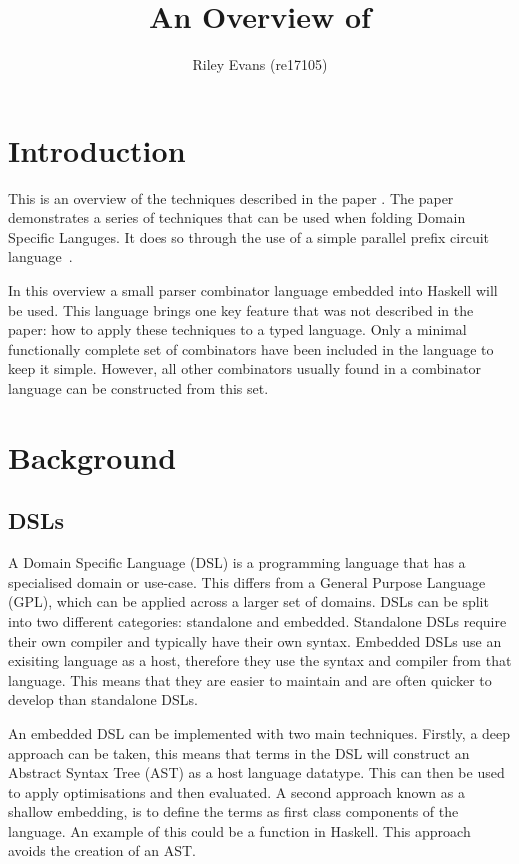 \documentclass[a4paper, twocolumn, 10pt]{extarticle}
\title{\vspace{-10mm}An Overview of \citetalias{embedding}\vspace{-4mm}}
\author{Riley Evans (re17105)}
\date{\vspace{-3mm}}
\begin{document}
\maketitle


\section{Introduction}

This is an overview of the techniques described in the paper .
The paper demonstrates a series of techniques that can be used when folding Domain Specific Languges.
It does so through the use of a simple parallel prefix circuit language~\cite{scans}.


In this overview a small parser combinator language embedded into Haskell will be used.
This language brings one key feature that was not described in the paper: how to apply these techniques to a typed language.
Only a minimal functionally complete set of combinators have been included in the language to keep it simple.
However, all other combinators usually found in a combinator language can be constructed from this set.



\section{Background}

\subsection{DSLs}

A Domain Specific Language (DSL) is a programming language that has a specialised domain or use-case.
This differs from a General Purpose Language (GPL), which can be applied across a larger set of domains.
DSLs can be split into two different categories: standalone and embedded. Standalone DSLs require their own compiler and typically have their own syntax.
Embedded DSLs use an exisiting language as a host, therefore they use the syntax and compiler from that language.
This means that they are easier to maintain and are often quicker to develop than standalone DSLs.

An embedded DSL can be implemented with two main techniques.
Firstly, a deep approach can be taken, this means that terms in the DSL will construct an Abstract Syntax Tree (AST) as a host language datatype.
This can then be used to apply optimisations and then evaluated.
A second approach known as a shallow embedding, is to define the terms as first class components of the language. An example of this could be a function in Haskell. This approach avoids the creation of an AST.
\end{document}
